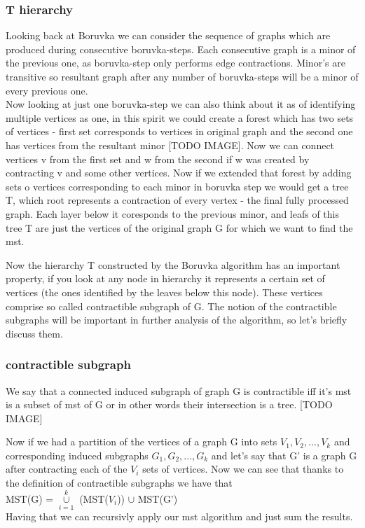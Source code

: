 \documentclass{article}
\begin{document}
\subsubsection{T hierarchy}
Looking back at Boruvka we can consider the sequence of graphs which are produced during consecutive boruvka-steps. Each consecutive graph is a minor of the previous one, as boruvka-step only performs edge contractions. Minor's are transitive so resultant graph after any number of boruvka-steps will be a minor of every previous one. \\ 
Now looking at just one boruvka-step we can also think about it as of identifying multiple vertices as one, in this spirit we could create a forest which has two sets of vertices - first set corresponds to vertices in original graph and the second one has vertices from the resultant minor [TODO IMAGE]. Now we can connect vertices v from the first set and w from the second if w was created by contracting v and some other vertices. Now if we extended that forest by adding sets o vertices corresponding to each minor in boruvka step we would get a tree T, which root represents a contraction of every vertex - the final fully processed graph. Each layer below it coresponds to the previous minor, and leafs of this tree T are just the vertices of the original graph G for which we want to find the mst.

Now the hierarchy T constructed by the Boruvka algorithm has an important property, if you look at any node in hierarchy it represents a certain set of vertices (the ones identified by the leaves below this node). These vertices comprise so called contractible subgraph of G. The notion of the contractible subgraphs will be important in further analysis of the algorithm, so let's briefly discuss them.

\subsubsection{contractible subgraph}
We say that a connected induced subgraph of graph G is contractible iff it's mst is a subset of mst of G or in other words their intersection is a tree.
[TODO IMAGE]


Now if we had a partition of the vertices of a graph G into sets {$V_1, V_2, ..., V_k$} and corresponding induced subgraphs {$G_1, G_2, ..., G_k$} and let's say that G' is a graph G after contracting each of the $V_i$ sets of vertices. Now we can see that thanks to the definition of contractible subgraphs we have that \\ MST(G) = $\cup\limits_{i=1}^{k}$ (MST($V_i$)) $\cup$ MST(G') \\ Having that we can recursivly apply our mst algorithm and just sum the results.
\end{document}
